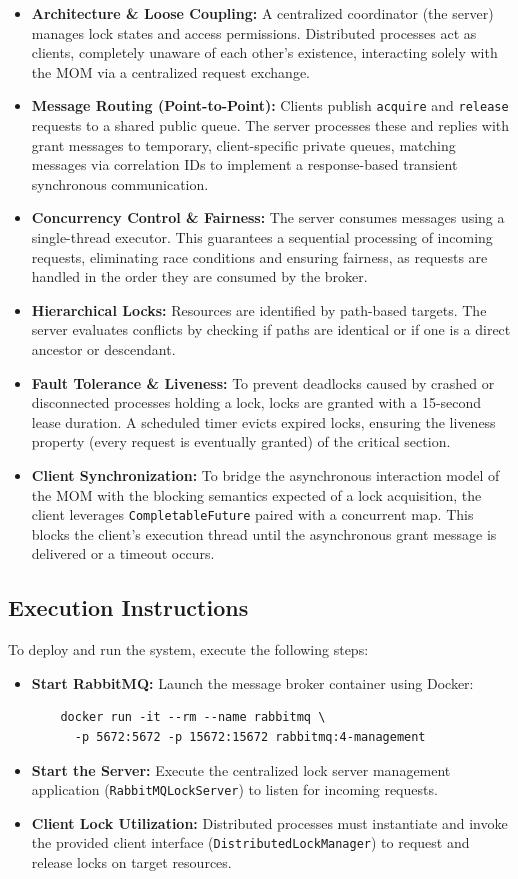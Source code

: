 \documentclass{scrartcl}
\begin{document}
\begin{itemize}
    \item \textbf{Architecture \& Loose Coupling:} A centralized coordinator (the server) manages lock states and access permissions.
    Distributed processes act as clients, completely unaware of each other's existence, interacting solely with the MOM via a centralized request exchange.
    \item \textbf{Message Routing (Point-to-Point):} Clients publish \texttt{acquire} and \texttt{release} requests to a shared public queue.
    The server processes these and replies with grant messages to temporary, client-specific private queues, matching messages via correlation IDs to implement a response-based transient synchronous communication.
    \item \textbf{Concurrency Control \& Fairness:} The server consumes messages using a single-thread executor.
    This guarantees a sequential processing of incoming requests, eliminating race conditions and ensuring fairness, as requests are handled in the order they are consumed by the broker.
    \item \textbf{Hierarchical Locks:} Resources are identified by path-based targets.
    The server evaluates conflicts by checking if paths are identical or if one is a direct ancestor or descendant.
    \item \textbf{Fault Tolerance \& Liveness:} To prevent deadlocks caused by crashed or disconnected processes holding a lock, locks are granted with a 15-second lease duration.
    A scheduled timer evicts expired locks, ensuring the liveness property (every request is eventually granted) of the critical section.
    \item \textbf{Client Synchronization:} To bridge the asynchronous interaction model of the MOM with the blocking semantics expected of a lock acquisition, the client leverages \texttt{CompletableFuture} paired with a concurrent map.
    This blocks the client's execution thread until the asynchronous grant message is delivered or a timeout occurs.
\end{itemize}

\subsection{Execution Instructions}
To deploy and run the system, execute the following steps:
\begin{itemize}
    \item \textbf{Start RabbitMQ:} Launch the message broker container using Docker:
    \begin{verbatim}
    docker run -it --rm --name rabbitmq \
      -p 5672:5672 -p 15672:15672 rabbitmq:4-management
    \end{verbatim}
    \item \textbf{Start the Server:} Execute the centralized lock server management application (\texttt{RabbitMQLockServer}) to listen for incoming requests.
    \item \textbf{Client Lock Utilization:} Distributed processes must instantiate and invoke the provided client interface (\texttt{DistributedLockManager}) to request and release locks on target resources.
\end{itemize}
\end{document}
